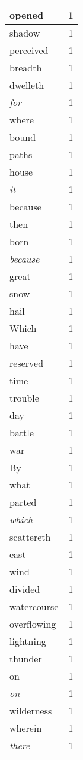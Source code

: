 \begin{center}
\begin{longtable}{l|r}
opened & 1 \\ \hline
shadow & 1 \\ \hline
perceived & 1 \\ \hline
breadth & 1 \\ \hline
dwelleth & 1 \\ \hline
\emph{for} & 1 \\ \hline
where & 1 \\ \hline
bound & 1 \\ \hline
paths & 1 \\ \hline
house & 1 \\ \hline
\emph{it} & 1 \\ \hline
because & 1 \\ \hline
then & 1 \\ \hline
born & 1 \\ \hline
\emph{because} & 1 \\ \hline
great & 1 \\ \hline
snow & 1 \\ \hline
hail & 1 \\ \hline
Which & 1 \\ \hline
have & 1 \\ \hline
reserved & 1 \\ \hline
time & 1 \\ \hline
trouble & 1 \\ \hline
day & 1 \\ \hline
battle & 1 \\ \hline
war & 1 \\ \hline
By & 1 \\ \hline
what & 1 \\ \hline
parted & 1 \\ \hline
\emph{which} & 1 \\ \hline
scattereth & 1 \\ \hline
east & 1 \\ \hline
wind & 1 \\ \hline
divided & 1 \\ \hline
watercourse & 1 \\ \hline
overflowing & 1 \\ \hline
lightning & 1 \\ \hline
thunder & 1 \\ \hline
on & 1 \\ \hline
\emph{on} & 1 \\ \hline
wilderness & 1 \\ \hline
wherein & 1 \\ \hline
\emph{there} & 1 \\ \hline

\end{longtable}
\end{center}
